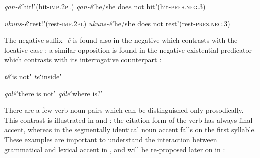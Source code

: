 \documentclass[output=paper,modfonts,nonflat,hidelinks]{langsci/langscibook}
\begin{document}
\begin{exe}
\ex \begin{xlist}
\ex \textit{qan-é}\hspace{15mm}ʻhit!ʼ\hspace{44mm}(hit-\textsc{imp}.2\textsc{pl})
\ex \textit{qan-ê}\hspace{15mm}ʻhe/she does not hitʼ\hspace{20mm}(hit-\textsc{pres}.\textsc{neg}.3)
\end{xlist}
\end{exe}

\begin{exe}
\ex \begin{xlist}
\ex \textit{ukuns-é}\hspace{12mm}ʻrest!ʼ\hspace{43mm}(rest-\textsc{imp}.2\textsc{pl})
\ex \textit{ukuns-ê}\hspace{12mm}ʻhe/she does not restʼ\hspace{19mm}(rest-\textsc{pres}.\textsc{neg}.3)
\end{xlist}
\end{exe}

The negative suffix \textit{-ê} is found also in the negative  which contrasts with the locative case ; a similar opposition is found in the negative existential predicator which contrasts with its interrogative counterpart :

\begin{exe}
\ex \label{ex:Petrollino:negativecopula}\begin{xlist}
\ex \textit{tê}\hspace{15mm}ʻis notʼ
\ex \textit{te}\hspace{15mm}ʻinsideʼ
\end{xlist}
\end{exe}

\begin{exe}
\ex \label{ex:Petrollino:negative existential} \begin{xlist}
\ex \textit{qolê}\hspace{12mm}ʻthere is notʼ
\ex \textit{qóle}\hspace{12mm}ʻwhere is?ʼ
\end{xlist}
\end{exe}

\largerpage
There are a few verb-noun pairs which can be distinguished only prosodically. This contrast is illustrated in  and : the citation form of the verb has always final accent, whereas in the segmentally identical noun accent falls on the first syllable. These examples are important to understand the interaction between grammatical and lexical accent in , and will be re-proposed later on in :
\end{document}
